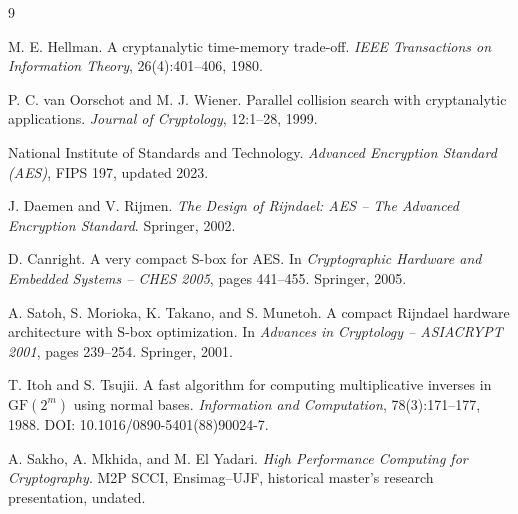 \documentclass[11pt]{article}
\begin{document}
\begin{thebibliography}{9}

M. E. Hellman.
\newblock A cryptanalytic time-memory trade-off.
\newblock \emph{IEEE Transactions on Information Theory}, 26(4):401--406,
1980.

P. C. van Oorschot and M. J. Wiener.
\newblock Parallel collision search with cryptanalytic applications.
\newblock \emph{Journal of Cryptology}, 12:1--28, 1999.

National Institute of Standards and Technology.
\newblock \emph{Advanced Encryption Standard (AES)}, FIPS 197, updated 2023.

J. Daemen and V. Rijmen.
\newblock \emph{The Design of Rijndael: AES -- The Advanced Encryption Standard}.
\newblock Springer, 2002.

D. Canright.
\newblock A very compact S-box for AES.
\newblock In \emph{Cryptographic Hardware and Embedded Systems -- CHES 2005},
pages 441--455. Springer, 2005.

A. Satoh, S. Morioka, K. Takano, and S. Munetoh.
\newblock A compact Rijndael hardware architecture with S-box optimization.
\newblock In \emph{Advances in Cryptology -- ASIACRYPT 2001}, pages 239--254.
Springer, 2001.


T. Itoh and S. Tsujii.
\newblock A fast algorithm for computing multiplicative inverses in
$\mathrm{GF}(2^m)$ using normal bases.
\newblock \emph{Information and Computation}, 78(3):171--177, 1988.
\newblock DOI: 10.1016/0890-5401(88)90024-7.

A. Sakho, A. Mkhida, and M. El Yadari.
\newblock \emph{High Performance Computing for Cryptography}.
\newblock M2P SCCI, Ensimag--UJF, historical master's research presentation, undated.

\end{thebibliography}
\end{document}
